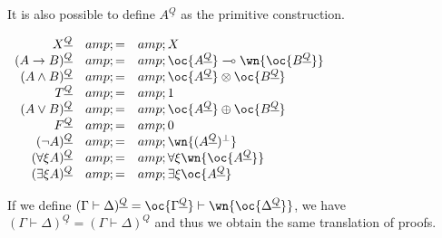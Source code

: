 It is also possible to define \(A^{\underline{Q}}\) as the primitive
construction.

\(\begin{array}{rcl}
X^{\underline{Q}} &amp; = &amp; X \\
(A\imp B)^{\underline{Q}} &amp; = &amp; \oc{A^{\underline{Q}}}\limp\wn{\oc{B^{\underline{Q}}}} \\
(A\wedge B)^{\underline{Q}} &amp; = &amp; \oc{A^{\underline{Q}}}\tens\oc{B^{\underline{Q}}} \\
T^{\underline{Q}} &amp; = &amp; \one \\
(A\vee B)^{\underline{Q}} &amp; = &amp; \oc{A^{\underline{Q}}}\plus\oc{B^{\underline{Q}}} \\
F^{\underline{Q}} &amp; = &amp; \zero \\
(\neg A)^{\underline{Q}} &amp; = &amp; \wn{(A^{\underline{Q}})\orth} \\
(\forall\xi A)^{\underline{Q}} &amp; = &amp; \forall\xi \wn{\oc{A^{\underline{Q}}}} \\
(\exists\xi A)^{\underline{Q}} &amp; = &amp; \exists\xi \oc{A^{\underline{Q}}}
\end{array}\)

If we define
\((\Gamma\vdash\Delta)^{\underline{Q}} = \oc{\Gamma^{\underline{Q}}}\vdash\wn{\oc{\Delta^{\underline{Q}}}}\),
we have
\((\Gamma\vdash\Delta)^{\underline{Q}} = (\Gamma\vdash\Delta)^Q\) and
thus we obtain the same translation of proofs.


